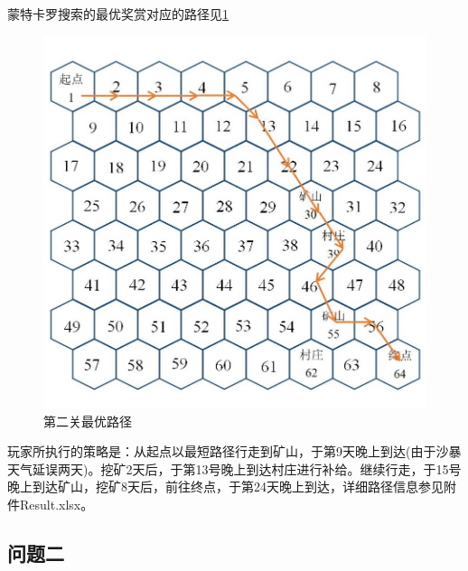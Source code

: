 \documentclass[withoutpreface,bwprint]{cumcmthesis} %
\begin{document}
蒙特卡罗搜索的最优奖赏对应的路径见\cref{fig:map2path}
\begin{figure}[H]
	\centering
	\includegraphics[scale=0.5]{figures/map2path.jpg}
	\caption{第二关最优路径}
	\label{fig:map2path}
\end{figure}

玩家所执行的策略是：从起点以最短路径行走到矿山，于第9天晚上到达(由于沙暴天气延误两天)。挖矿2天后，于第13号晚上到达村庄进行补给。继续行走，于15号晚上到达矿山，挖矿8天后，前往终点，于第24天晚上到达，详细路径信息参见附件Result.xlsx。



\subsection{问题二}
\end{document}
